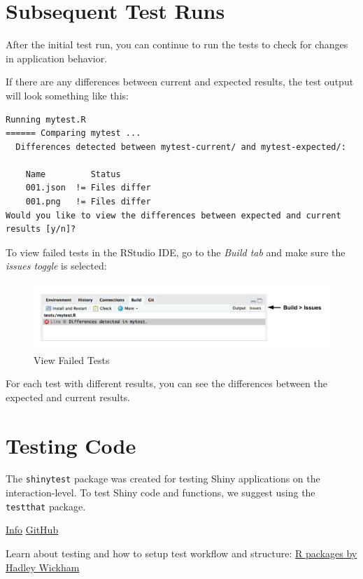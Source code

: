 \documentclass[]{book}
\theoremstyle{definition}
\theoremstyle{definition}
\theoremstyle{definition}
\theoremstyle{remark}
\begin{document}
\hypertarget{subsequent-test-runs}{%
\section{Subsequent Test Runs}\label{subsequent-test-runs}}

After the initial test run, you can continue to run the tests to check
for changes in application behavior.

If there are any differences between current and expected results, the
test output will look something like this:

\begin{verbatim}
Running mytest.R 
====== Comparing mytest ...
  Differences detected between mytest-current/ and mytest-expected/:

    Name         Status      
    001.json  != Files differ
    001.png   != Files differ
Would you like to view the differences between expected and current results [y/n]? 
\end{verbatim}

To view failed tests in the RStudio IDE, go to the \emph{Build tab} and
make sure the \emph{issues toggle} is selected:

\begin{figure}
\centering
\includegraphics{imgs/testing/failed_tests.png}
\caption{View Failed Tests}
\end{figure}

For each test with different results, you can see the differences
between the expected and current results.

\hypertarget{testing-code}{%
\section{Testing Code}\label{testing-code}}

The \texttt{shinytest} package was created for testing Shiny
applications on the interaction-level. To test Shiny code and functions,
we suggest using the \texttt{testthat} package.

\href{http://testthat.r-lib.org/}{Info}
\href{https://github.com/r-lib/testthat}{GitHub}

Learn about testing and how to setup test workflow and structure:
\href{http://r-pkgs.had.co.nz/tests.html}{R packages by Hadley Wickham}
\end{document}
